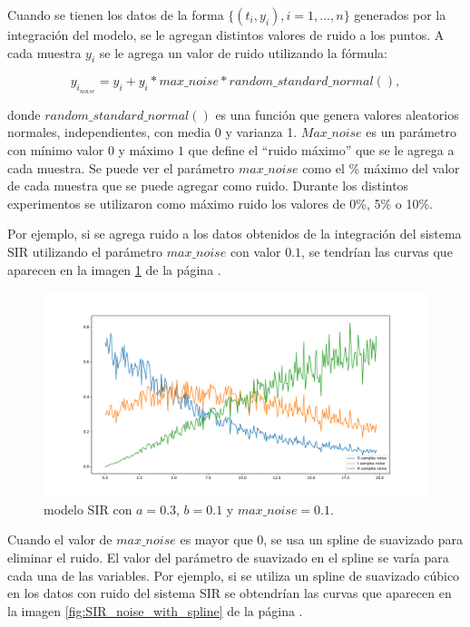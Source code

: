Cuando se tienen los datos de la forma $\{(t_i, y_i), i=1, \dots, n\}$ generados por la integración del modelo, se le agregan distintos valores de ruido a los puntos. A cada muestra $y_i$ se le agrega un valor de ruido utilizando la fórmula:

$$y_{i_{noise}} = y_i + y_i * max\_noise * random\_standard\_normal(),$$

donde $random\_standard\_normal()$ es una función que genera valores aleatorios normales, independientes, con media 0 y varianza 1. $Max\_noise$ es un parámetro con mínimo valor $0$ y máximo $1$ que define el ``ruido  máximo'' que se le agrega a cada muestra. Se puede ver el parámetro $max\_noise$ como el \% máximo del valor de cada muestra que se puede agregar como ruido. Durante los distintos experimentos se utilizaron como máximo ruido los valores de 0\%, 5\% o 10\%.

Por ejemplo, si se agrega ruido a los datos obtenidos de la integración del sistema SIR utilizando el parámetro $max\_noise$ con valor $0.1$, se tendrían las curvas que aparecen en la imagen \ref{fig:SIR_with_noise} de la página \pageref{fig:SIR_with_noise}.

\begin{figure}[h]
    \centering
    \includegraphics[width=\textwidth]{"figures/SIR_with_noise.pdf"}
    \caption{modelo SIR con $a = 0.3$, $b = 0.1$ y $max\_noise = 0.1$.}
    \label{fig:SIR_with_noise}
\end{figure}

Cuando el valor de $max\_noise$ es mayor que 0, se usa un spline de suavizado para eliminar el ruido. El valor del parámetro de suavizado en el spline se varía para cada una de las variables. Por ejemplo, si se utiliza un spline de suavizado cúbico en los datos con ruido del sistema SIR se obtendrían las curvas que aparecen en la imagen \ref{fig:SIR_noise_with_spline} de la página \pageref{fig:SIR_noise_with_spline}.

